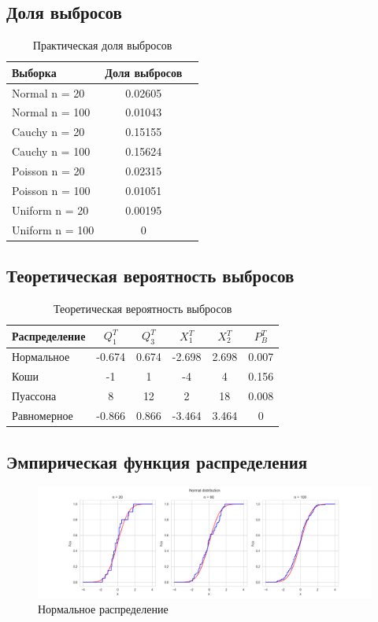 \documentclass[../main.tex]{subfiles}
\begin{document}
    \subsection{Доля выбросов}
    \begin{table}[H]
	\centering
	\begin{tabular}{|l|c|c|}
		\hline
		Выборка & Доля выбросов	\\\hline
		\hline
		Normal n = 20 & 0.02605 \\\hline
		Normal n = 100 & 0.01043 \\\hline
		Cauchy n = 20 & 0.15155 \\\hline
		Cauchy n = 100 & 0.15624 \\\hline
		Poisson n = 20 & 0.02315 \\\hline
		Poisson n = 100 & 0.01051 \\\hline
		Uniform n = 20 & 0.00195\\\hline
		Uniform n = 100 & 0 \\\hline
	\end{tabular}
	\caption{Практическая доля выбросов}
    \end{table}
    
    \subsection{Теоретическая вероятность выбросов}
    
    \begin{table}[H]
	\centering
	\begin{tabular}{|l|c|c|c|c|c|}
		\hline
		Распределение & $Q_1^T$	& $Q_3^T$ & $X_1^T$ & $X_2^T$ & $P_B^T$\\\hline
		\hline
		Нормальное & -0.674 & 0.674 & -2.698 &  2.698 & 0.007\\\hline
		Коши & -1 & 1 & -4 & 4 & 0.156\\\hline
		Пуассона & 8 & 12 & 2 & 18 & 0.008\\\hline
		Равномерное & -0.866 & 0.866 & -3.464 & 3.464 & 0\\\hline
	\end{tabular}
	\caption{Теоретическая вероятность выбросов}
    \end{table}
    
    \subsection{Эмпирическая функция распределения}
    
    \begin{figure}[H]
        \centering
        \includegraphics[scale=0.5]{figures/NormalEmpirical.png}
        \caption{Нормальное распределение}
        \label{fig:normal}
    \end{figure}
    
\end{document}
